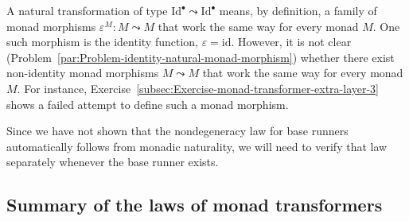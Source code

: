 A natural transformation of type $\text{Id}^{\bullet}\leadsto\text{Id}^{\bullet}$
means, by definition, a family of monad morphisms $\varepsilon^{M}:M\leadsto M$
that work the same way for every monad $M$. One such morphism is
the identity function, $\varepsilon=\text{id}$. However, it is not
clear (Problem~\ref{par:Problem-identity-natural-monad-morphism})
whether there exist non-identity monad morphisms $M\leadsto M$ that
work the same way for every monad $M$. For instance, Exercise~\ref{subsec:Exercise-monad-transformer-extra-layer-3}
shows a failed attempt to define such a monad morphism.

Since we have not shown that the nondegeneracy law for base runners
automatically follows from monadic naturality, we will need to verify
that law separately whenever the base runner exists.

\subsection{Summary of the laws of monad transformers\label{subsec:Laws-of-monad-transformers}}

